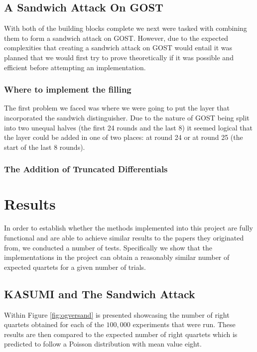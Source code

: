 \documentclass[10pt,journal,compsoc]{IEEEtran}
\begin{document}
\subsection{A Sandwich Attack On GOST}
With both of the building blocks complete we next were tasked with combining them to form a sandwich attack on GOST. However, due to the expected complexities that creating a sandwich attack on GOST would entail it was planned that we would first try to prove theoretically if it was possible and efficient before attempting an implementation. 

\subsubsection{Where to implement the filling}
The first problem we faced was where we were going to put the layer that incorporated the sandwich distinguisher. Due to the nature of GOST being split into two unequal halves (the first 24 rounds and the last 8) it seemed logical that the layer could be added in one of two places: at round 24 or at round 25 (the start of the last 8 rounds). 

\subsubsection{The Addition of Truncated Differentials}


\section{Results}
In order to establish whether the methods implemented into this project are fully functional and are able to achieve similar results to the papers they originated from, we conducted a number of tests. Specifically we show that the implementations in the project can obtain a reasonably similar number of expected quartets for a given number of trials.

\subsection{KASUMI and The Sandwich Attack}
Within \cite{jofc-2014-25962} Figure \ref{fig:ogversand} is presented showcasing the number of right quartets obtained for each of the \(100,000\) experiments that were run. These results are then compared to the expected number of right quartets which is predicted to follow a Poisson distribution with mean value eight. 
\end{document}
